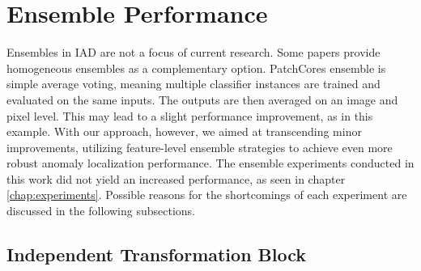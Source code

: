 \section{Ensemble Performance}
\label{sec:ensemblediscussion}

Ensembles in IAD are not a focus of current research. Some papers \cite{patchCore2022} provide homogeneous ensembles as a complementary option. 
PatchCores ensemble is simple average voting, meaning multiple classifier instances are trained and evaluated on the same inputs. The outputs are then averaged on an image and pixel level. 
This may lead to a slight performance improvement, as in this example. 
With our approach, however, we aimed at transcending minor improvements, utilizing feature-level ensemble strategies to achieve even more robust anomaly localization performance.
The ensemble experiments conducted in this work did not yield an increased performance, as seen in chapter \ref{chap:experiments}. 
Possible reasons for the shortcomings of each experiment are discussed in the following subsections.

\subsection{Independent Transformation Block}
\label{subsec:ITBfaildiscussion}

